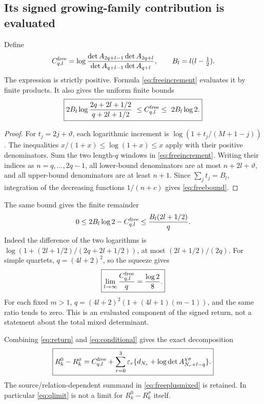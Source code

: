 \documentclass[11pt,a4paper]{article}
\newcommand{\eps}{\varepsilon}
\begin{document}
\subsection{Its signed growing-family contribution is evaluated}
Define
\begin{equation}
 C_{q,l}^{\rm free}
 =\log\frac{\det A_{2q+l-1}\det A_{2q+l}}
 {\det A_{q+l-1}\det A_{q+l}},\qquad B_l=l(l-\tfrac12).
\end{equation}
The expression is strictly positive. Formula \eqref{eq:freeincrement} evaluates it by finite products. It also gives the uniform finite bounds
\begin{equation}
 \boxed{
 2B_l\log\frac{2q+2l+1/2}{q+2l+1/2}
 \ \le C_{q,l}^{\rm free}\le\ 2B_l\log2.}
 \label{eq:freebound}
\end{equation}
\begin{proof}
For $t_j=2j+\vartheta$, each logarithmic increment is
$\log(1+t_j/(M+1-j))$. The inequalities $x/(1+x)\le\log(1+x)\le x$ apply with their positive denominators. Sum the two length-$q$ windows in \eqref{eq:freeincrement}. Writing their indices as $n=q,\ldots,2q-1$, all lower-bound denominators are at most $n+2l+\vartheta$, and all upper-bound denominators are at least $n+1$. Since $\sum_jt_j=B_l$, integration of the decreasing functions $1/(n+c)$ gives \eqref{eq:freebound}.
\end{proof}
The same bound gives the finite remainder
\begin{equation}
 0\le 2B_l\log2-C_{q,l}^{\rm free}
 \le \frac{B_l(2l+1/2)}q.
\end{equation}
Indeed the difference of the two logarithms is
$\log(1+(2l+1/2)/(2q+2l+1/2))$, at most $(2l+1/2)/(2q)$.
For simple quartets, $q=(4l+2)^2$, so the squeeze gives
\begin{equation}
 \boxed{\lim_{l\to\infty}\frac{C_{q,l}^{\rm free}}q=\frac{\log2}{8}.}
 \label{eq:qlimit}
\end{equation}
For each fixed $m>1$, $q=(4l+2)^2(1+(4l+1)(m-1))$, and the same ratio tends to zero. This is an evaluated component of the signed return, not a statement about the total mixed determinant.

Combining \eqref{eq:return} and \eqref{eq:conditional} gives the exact decomposition
\begin{equation}
 \boxed{
 R_k^0-R_k^\sigma=C_{q,l}^{\rm free}+
 \sum_{r=0}^3\eps_r
 \{d_{N_r}+\log\det A_{N_r+l-q}^{\chi\sigma}\}.}
 \label{eq:freeplusmixed}
\end{equation}
The source/relation-dependent summand in \eqref{eq:freeplusmixed} is retained. In particular \eqref{eq:qlimit} is not a limit for $R_k^0-R_k^\sigma$ itself.
\end{document}
